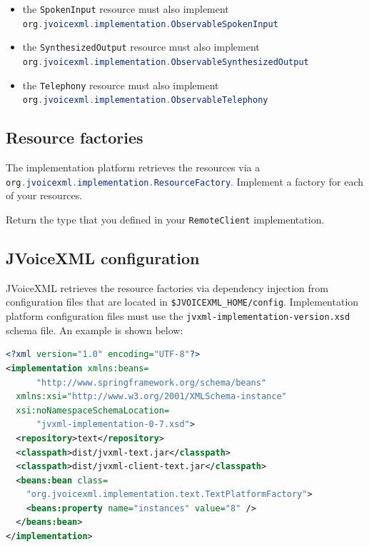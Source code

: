 \documentclass[11pt,a4paper]{book}
\begin{document}
\begin{itemize}
  \item the \lstinline[language=Java]{SpokenInput} resource must also implement
  \\
  \lstinline[language=Java]{org.jvoicexml.implementation.ObservableSpokenInput}
  \item the \lstinline[language=Java]{SynthesizedOutput} resource must also
  implement \\
  \lstinline[language=Java]{org.jvoicexml.implementation.ObservableSynthesizedOutput}
  \item the \lstinline[language=Java]{Telephony} resource must also implement \\
  \lstinline[language=Java]{org.jvoicexml.implementation.ObservableTelephony}
\end{itemize}

\subsection{Resource factories}

The implementation platform retrieves the resources via a
\lstinline[language=Java]{org.jvoicexml.implementation.ResourceFactory}.
Implement a factory for each of your resources.

Return the type that you defined in your
\lstinline[language=Java]{RemoteClient} implementation.

\subsection{JVoiceXML configuration}

JVoiceXML retrieves the resource factories via dependency injection from
configuration files that are located in
\lstinline{$JVOICEXML_HOME/config}. Implementation platform configuration files
must use the \lstinline{jvxml-implementation-version.xsd} schema file.
An example is shown below:

\begin{lstlisting}[language=XML]
<?xml version="1.0" encoding="UTF-8"?>
<implementation xmlns:beans=
      "http://www.springframework.org/schema/beans"
  xmlns:xsi="http://www.w3.org/2001/XMLSchema-instance"
  xsi:noNamespaceSchemaLocation=
      "jvxml-implementation-0-7.xsd">
  <repository>text</repository>
  <classpath>dist/jvxml-text.jar</classpath>
  <classpath>dist/jvxml-client-text.jar</classpath>
  <beans:bean class=
    "org.jvoicexml.implementation.text.TextPlatformFactory">
    <beans:property name="instances" value="8" />
  </beans:bean>
</implementation>
\end{lstlisting}
\end{document}
